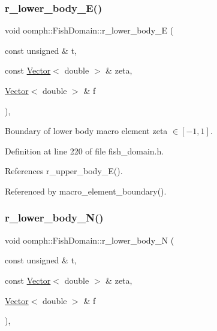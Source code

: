 \subsubsection{\texorpdfstring{r\+\_\+lower\+\_\+body\+\_\+\+E()}{r\_lower\_body\_E()}}
{\footnotesize\ttfamily void oomph\+::\+Fish\+Domain\+::r\+\_\+lower\+\_\+body\+\_\+E (\begin{DoxyParamCaption}\item[{const unsigned \&}]{t,  }\item[{const \hyperlink{classoomph_1_1Vector}{Vector}$<$ double $>$ \&}]{zeta,  }\item[{\hyperlink{classoomph_1_1Vector}{Vector}$<$ double $>$ \&}]{f }\end{DoxyParamCaption})\hspace{0.3cm}{\ttfamily [inline]}, {\ttfamily [private]}}



Boundary of lower body macro element zeta $ \in [-1,1] $. 



Definition at line 220 of file fish\+\_\+domain.\+h.



References r\+\_\+upper\+\_\+body\+\_\+\+E().



Referenced by macro\+\_\+element\+\_\+boundary().

\mbox{\label{classoomph_1_1FishDomain_a75131ac72e23d5b1d701b588c0596b5d}} 
\subsubsection{\texorpdfstring{r\+\_\+lower\+\_\+body\+\_\+\+N()}{r\_lower\_body\_N()}}
{\footnotesize\ttfamily void oomph\+::\+Fish\+Domain\+::r\+\_\+lower\+\_\+body\+\_\+N (\begin{DoxyParamCaption}\item[{const unsigned \&}]{t,  }\item[{const \hyperlink{classoomph_1_1Vector}{Vector}$<$ double $>$ \&}]{zeta,  }\item[{\hyperlink{classoomph_1_1Vector}{Vector}$<$ double $>$ \&}]{f }\end{DoxyParamCaption})\hspace{0.3cm}{\ttfamily [inline]}, {\ttfamily [private]}}



